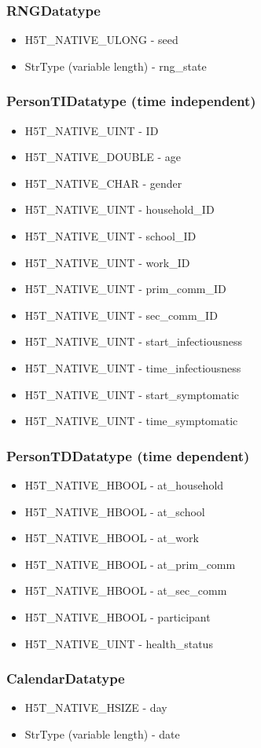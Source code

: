 		\subsubsection{RNGDatatype}
			\begin{itemize}
				\item H5T\_NATIVE\_ULONG - seed
				\item StrType (variable length) - rng\_state
			\end{itemize}

		\subsubsection{PersonTIDatatype (time independent)}
			\begin{itemize}
				\item H5T\_NATIVE\_UINT - ID
				\item H5T\_NATIVE\_DOUBLE - age
				\item H5T\_NATIVE\_CHAR - gender

				\item H5T\_NATIVE\_UINT - household\_ID
				\item H5T\_NATIVE\_UINT - school\_ID
				\item H5T\_NATIVE\_UINT - work\_ID
				\item H5T\_NATIVE\_UINT - prim\_comm\_ID
				\item H5T\_NATIVE\_UINT - sec\_comm\_ID

				\item H5T\_NATIVE\_UINT - start\_infectiousness
				\item H5T\_NATIVE\_UINT - time\_infectiousness
				\item H5T\_NATIVE\_UINT - start\_symptomatic
				\item H5T\_NATIVE\_UINT - time\_symptomatic
			\end{itemize}

		\subsubsection{PersonTDDatatype (time dependent)}
			\begin{itemize}
				\item H5T\_NATIVE\_HBOOL - at\_household
				\item H5T\_NATIVE\_HBOOL - at\_school
				\item H5T\_NATIVE\_HBOOL - at\_work
				\item H5T\_NATIVE\_HBOOL - at\_prim\_comm
				\item H5T\_NATIVE\_HBOOL - at\_sec\_comm
				\item H5T\_NATIVE\_HBOOL - participant

				\item H5T\_NATIVE\_UINT - health\_status
			\end{itemize}

		\subsubsection{CalendarDatatype}
			\begin{itemize}
				\item H5T\_NATIVE\_HSIZE - day
				\item StrType (variable length) - date
			\end{itemize}